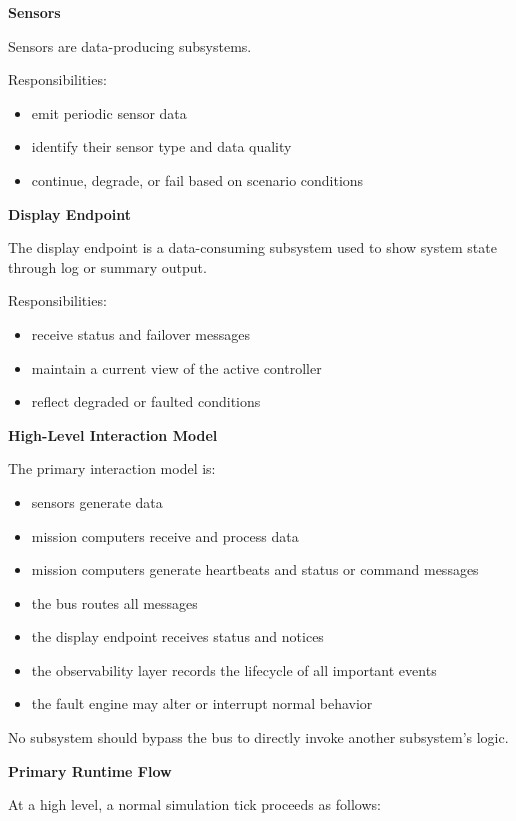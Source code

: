 \documentclass[12pt]{article}
\begin{document}
\textbf{Sensors}

Sensors are data-producing subsystems.

Responsibilities:
\begin{itemize}[leftmargin=*]
    \item emit periodic sensor data
    \item identify their sensor type and data quality
    \item continue, degrade, or fail based on scenario conditions
\end{itemize}

\textbf{Display Endpoint}

The display endpoint is a data-consuming subsystem used to show system state through log or summary output.

Responsibilities:
\begin{itemize}[leftmargin=*]
    \item receive status and failover messages
    \item maintain a current view of the active controller
    \item reflect degraded or faulted conditions
\end{itemize}

\textbf{High-Level Interaction Model}

The primary interaction model is:
\begin{itemize}[leftmargin=*]
    \item sensors generate data
    \item mission computers receive and process data
    \item mission computers generate heartbeats and status or command messages
    \item the bus routes all messages
    \item the display endpoint receives status and notices
    \item the observability layer records the lifecycle of all important events
    \item the fault engine may alter or interrupt normal behavior
\end{itemize}

No subsystem should bypass the bus to directly invoke another subsystem's logic.

\textbf{Primary Runtime Flow}

At a high level, a normal simulation tick proceeds as follows:
\end{document}
